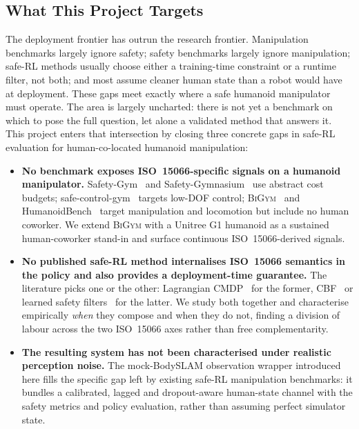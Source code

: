 \documentclass[11pt,a4paper]{report}
\newcommand{\iso}{ISO~15066}
\newcommand{\bigym}{\textsc{BiGym}}
\newcommand{\bodyslampp}{BodySLAM\nolinebreak[4]\hspace{-.05em}\raisebox{.2ex}{\scriptsize ++}}
\begin{document}
\subsection{What This Project Targets}
\label{sec:intro:mot:targets}

The deployment frontier has outrun the research frontier. Manipulation
benchmarks largely ignore safety; safety benchmarks largely ignore
manipulation; safe-RL methods usually choose either a training-time
constraint or a runtime filter, not both; and most assume cleaner human
state than a robot would have at deployment. These gaps meet exactly
where a safe humanoid manipulator must operate. The area is largely
uncharted: there is not yet a benchmark on which to pose the full
question, let alone a validated method that answers it. This project
enters that intersection by closing three concrete gaps in safe-RL
evaluation for human-co-located humanoid manipulation:

\begin{itemize}[topsep=2pt,itemsep=2pt]
\item \textbf{No benchmark exposes \iso{}-specific signals on a
  humanoid manipulator.} Safety-Gym~\cite{ray2019safetygym} and
  Safety-Gymnasium~\cite{ji2023safetygymnasium} use abstract cost
  budgets; safe-control-gym~\cite{yuan2022safecontrolgym} targets
  low-DOF control; \bigym{}~\cite{chernyadev2024bigym} and
  HumanoidBench~\cite{sferrazza2024humanoidbench} target manipulation
  and locomotion but include no human coworker. We extend
  \bigym{} with a Unitree G1 humanoid as a sustained human-coworker
  stand-in and surface continuous \iso{}-derived signals.
\item \textbf{No published safe-RL method internalises \iso{}
  semantics in the policy and also provides a deployment-time
  guarantee.} The literature picks one or the other: Lagrangian
  CMDP~\cite{ray2019safetygym,stooke2020pid} for the former,
  CBF~\cite{ames2019cbf,shield2025} or learned safety
  filters~\cite{srinivasan2020learning,thananjeyan2021recovery} for
  the latter. We study both together and characterise empirically
  \emph{when} they compose and when they do not, finding a division of
  labour across the two \iso{} axes rather than free complementarity.
\item \textbf{The resulting system has not been characterised under
  realistic perception noise.} The mock-\bodyslampp{} observation
  wrapper introduced here fills the specific gap left by existing
  safe-RL manipulation benchmarks: it bundles a calibrated, lagged and
  dropout-aware human-state channel with the safety metrics and policy
  evaluation, rather than assuming perfect simulator state.
\end{itemize}
\end{document}

